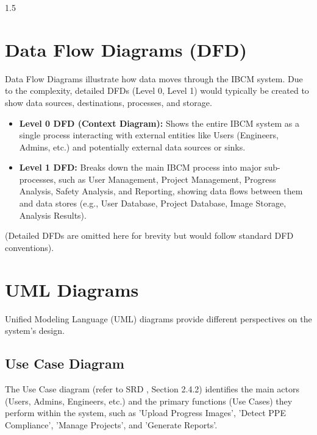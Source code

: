 \documentclass[12pt,a4paper]{report}
\begin{document}
\begin{spacing}{1.5}
    \section{Data Flow Diagrams (DFD)}
    Data Flow Diagrams illustrate how data moves through the IBCM system. Due to the complexity, detailed DFDs (Level 0, Level 1) would typically be created to show data sources, destinations, processes, and storage.

    \begin{itemize}
        \item \textbf{Level 0 DFD (Context Diagram):} Shows the entire IBCM system as a single process interacting with external entities like Users (Engineers, Admins, etc.) and potentially external data sources or sinks.
        \item \textbf{Level 1 DFD:} Breaks down the main IBCM process into major sub-processes, such as User Management, Project Management, Progress Analysis, Safety Analysis, and Reporting, showing data flows between them and data stores (e.g., User Database, Project Database, Image Storage, Analysis Results).
    \end{itemize}
    (Detailed DFDs are omitted here for brevity but would follow standard DFD conventions).

    \section{UML Diagrams}
    Unified Modeling Language (UML) diagrams provide different perspectives on the system's design.

    \subsection{Use Case Diagram}
    The Use Case diagram (refer to SRD \cite{SRD_IBCM}, Section 2.4.2) identifies the main actors (Users, Admins, Engineers, etc.) and the primary functions (Use Cases) they perform within the system, such as 'Upload Progress Images', 'Detect PPE Compliance', 'Manage Projects', and 'Generate Reports'.

    \begin{figure}[H]
        \centering
\end{figure}
\end{spacing}
\end{document}
